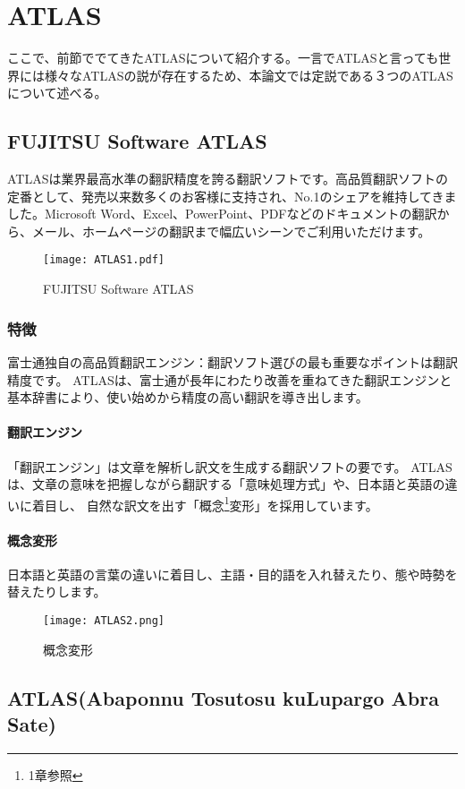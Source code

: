 \section{ATLAS}
ここで、前節ででてきたATLASについて紹介する。一言でATLASと言っても世界には様々なATLASの説が存在するため、本論文では定説である３つのATLASについて述べる。

\subsection{FUJITSU Software ATLAS}
ATLASは業界最高水準の翻訳精度を誇る翻訳ソフトです。高品質翻訳ソフトの定番として、発売以来数多くのお客様に支持され、No.1のシェアを維持してきました。Microsoft Word、Excel、PowerPoint、PDFなどのドキュメントの翻訳から、メール、ホームページの翻訳まで幅広いシーンでご利用いただけます。

\begin{figure}[H]
\centering
\texttt{[image: ATLAS1.pdf]}
\caption{FUJITSU Software ATLAS}
\end{figure}

\subsubsection{特徴}
富士通独自の高品質翻訳エンジン：翻訳ソフト選びの最も重要なポイントは翻訳精度です。 ATLASは、富士通が長年にわたり改善を重ねてきた翻訳エンジンと基本辞書により、使い始めから精度の高い翻訳を導き出します。
\paragraph{翻訳エンジン}
「翻訳エンジン」は文章を解析し訳文を生成する翻訳ソフトの要です。 ATLASは、文章の意味を把握しながら翻訳する「意味処理方式」や、日本語と英語の違いに着目し、 自然な訳文を出す「概念\footnote{1章参照}変形」を採用しています。
\paragraph*{概念変形}
日本語と英語の言葉の違いに着目し、主語・目的語を入れ替えたり、態や時勢を替えたりします。

\begin{figure}[H]
  \centering
  \texttt{[image: ATLAS2.png]}
  \caption{概念変形}
\end{figure}

\subsection{ATLAS(Abaponnu Tosutosu kuLupargo Abra Sate)}
